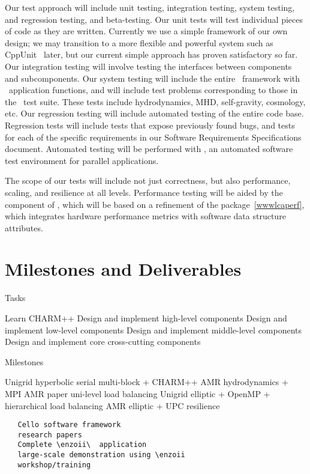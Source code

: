 \documentclass[10pt]{article}
\begin{document}
Our test approach will include unit testing, integration testing,
system testing, and regression testing, and beta-testing.  Our unit
tests will test individual pieces of code as they are written.
Currently we use a simple framework of our own design; we may
transition to a more flexible and powerful system such as
CppUnit~\cite{wwwcppunit} later, but our current simple approach has
proven satisfactory so far.  Our integration testing will involve
testing the interfaces between components and subcomponents.  Our
system testing will include the entire \cello\ framework with \enzoii\
application functions, and will include test problems corresponding to
those in the \enzo\ test suite.  These tests include hydrodynamics,
MHD, self-gravity, cosmology, etc.  Our regression testing will
include automated testing of the entire code base.  Regression tests
will include tests that expose previously found bugs, and tests for
each of the specific requirements in our Software Requirements
Specifications document.  Automated testing will be performed with
\lcatest, an automated software test environment for parallel
applications.  

The scope of our tests will include not just correctness, but also
performance, scaling, and resilience at all levels.  Performance
testing will be aided by the \code{Performance} component of \cello,
which will be based on a refinement of the \code{lcaperf}
package~\ref{wwwlcaperf}, which integrates hardware performance
metrics with software data structure attributes.


\section{Milestones and Deliverables} \label{s:milestones}

Tasks

Learn CHARM++
Design and implement high-level components
Design and implement low-level components
Design and implement middle-level components
Design and implement core cross-cutting components

Milestones

Unigrid hyperbolic
  serial multi-block
  + CHARM++
AMR hydrodynamics
  + MPI
    AMR paper
    uni-level load balancing
Unigrid elliptic
  + OpenMP
  + hierarchical load balancing
AMR elliptic
  + UPC
    resilience

\begin{verbatim}
   Cello software framework
   research papers
   Complete \enzoii\  application
   large-scale demonstration using \enzoii
   workshop/training
\end{verbatim}



\end{document}
